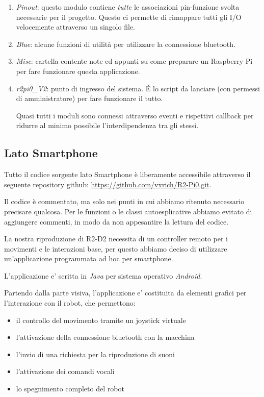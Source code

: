 \documentclass[12pt]{article}
\newcommand{\raspi}{Raspberry Pi}
\begin{document}
\begin{enumerate}
\item \emph{Pinout}: questo modulo contiene \emph{tutte} le associazioni pin-funzione svolta necessarie per il progetto. Questo ci permette di rimappare tutti gli I/O velocemente attraverso un singolo file.
\item \emph{Blue}: alcune funzioni di utilità per utilizzare la connessione bluetooth.
\item \emph{Misc}: cartella contente note ed appunti su come preparare un \raspi{} per fare funzionare questa applicazione.
\item \emph{r2pi0\_{}V2}: punto di ingresso del sistema. \'E lo script da lanciare (con permessi di amministratore) per fare funzionare il tutto.

Quasi tutti i moduli sono connessi attraverso eventi e rispettivi callback per ridurre al minimo possibile l'interdipendenza tra gli stessi.
\end{enumerate}

\subsection{Lato Smartphone}

\begin{minipage}{\linewidth}
Tutto il codice sorgente lato Smartphone è liberamente accessibile attraverso il seguente repository github: \url{https://github.com/vxrich/R2-Pi0.git}.
\end{minipage}

Il codice è commentato, ma solo nei punti in cui abbiamo ritenuto necessario precisare qualcosa. Per le funzioni o le classi autoesplicative abbiamo evitato di aggiungere commenti, in modo da non appesantire la lettura del codice.

La nostra riproduzione di R2-D2 necessita di un controller remoto per i movimenti e le interazioni base,
per questo abbiamo deciso di utilizzare un'applicazione programmata ad hoc per smartphone.

L'applicazione e' scritta in \emph{Java} per sistema operativo \emph{Android}.

\medskip

Partendo dalla parte visiva, l'applicazione e' costituita da elementi grafici per l'interazione con il robot, che permettono:
\begin{itemize}
\item il controllo del movimento tramite un joystick virtuale
\item l'attivazione della connessione bluetooth con la macchina
\item l'invio di una richiesta per la riproduzione di suoni
\item l'attivazione dei comandi vocali
\item lo spegnimento completo del robot
\end{itemize}
\end{document}
